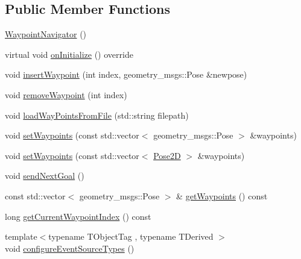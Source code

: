 \subsection*{Public Member Functions}
\begin{DoxyCompactItemize}
\item 
\hyperlink{classcl__move__base__z_1_1WaypointNavigator_a62d2f964f5537e17f94317c2f69c8969}{Waypoint\+Navigator} ()
\item 
virtual void \hyperlink{classcl__move__base__z_1_1WaypointNavigator_a75f7b66878f380dd81516fbd7cb3640d}{on\+Initialize} () override
\item 
void \hyperlink{classcl__move__base__z_1_1WaypointNavigator_a5d40e7942620c3c191e2a3bd75845069}{insert\+Waypoint} (int index, geometry\+\_\+msgs\+::\+Pose \&newpose)
\item 
void \hyperlink{classcl__move__base__z_1_1WaypointNavigator_a0a7e9e35ed5ba02ff4cfb580ffa25e9a}{remove\+Waypoint} (int index)
\item 
void \hyperlink{classcl__move__base__z_1_1WaypointNavigator_a18d74467ddf0e637a8d5a6e1fa2e93db}{load\+Way\+Points\+From\+File} (std\+::string filepath)
\item 
void \hyperlink{classcl__move__base__z_1_1WaypointNavigator_a477992dbb2eca9ee77a396d0fe1b084b}{set\+Waypoints} (const std\+::vector$<$ geometry\+\_\+msgs\+::\+Pose $>$ \&waypoints)
\item 
void \hyperlink{classcl__move__base__z_1_1WaypointNavigator_aa164ff2510b9549b0b73df6eb18a7a4f}{set\+Waypoints} (const std\+::vector$<$ \hyperlink{structcl__move__base__z_1_1Pose2D}{Pose2D} $>$ \&waypoints)
\item 
void \hyperlink{classcl__move__base__z_1_1WaypointNavigator_a1e0a8ff536d2d01a01063fd903029347}{send\+Next\+Goal} ()
\item 
const std\+::vector$<$ geometry\+\_\+msgs\+::\+Pose $>$ \& \hyperlink{classcl__move__base__z_1_1WaypointNavigator_a553cdd4ddc20ff26c1bdcb6dad42911f}{get\+Waypoints} () const
\item 
long \hyperlink{classcl__move__base__z_1_1WaypointNavigator_a753c3df56b96c49438a361d3e5234f79}{get\+Current\+Waypoint\+Index} () const
\item 
{\footnotesize template$<$typename T\+Object\+Tag , typename T\+Derived $>$ }\\void \hyperlink{classcl__move__base__z_1_1WaypointNavigator_a990251ed37b12f67f756be17ca85b242}{configure\+Event\+Source\+Types} ()
\end{DoxyCompactItemize}
